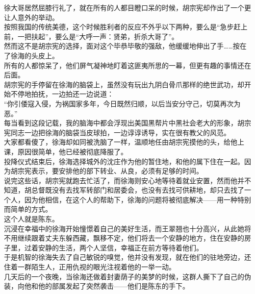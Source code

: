 \begin{multicols}{\theparacolNo}
徐大哥居然屈膝行礼了，就在所有的人都目瞪口呆的时候，胡宗宪却作出了一个更让人意外的举动。\\

按照我国的传统美德，这个时候胜利者的反应不外乎以下两种，要么是“急步赶上前，一把扶起”，要么是“大呼一声：贤弟，折杀大哥了”。\\

然而这不是胡宗宪的选择，面对这个毕恭毕敬的强敌，他缓缓地伸出了手……按在了徐海的头皮上。\\

所有的人都惊呆了，他们屏气凝神地盯着这匪夷所思的一幕，但更有趣的事情还在后面。\\

胡宗宪的手停留在徐海的脑袋上，虽然没有玩出九阴白骨爪那样的绝世武功，却开始不停地拍抚，一边拍还一边说道：\\

“你引倭寇入侵，为祸国家多年，今日既然归顺，以后当安分守己，切莫再次为恶。”\\

每当看到这段记载，我的脑海中都会浮现出美国黑帮片中黑社会老大的形象，胡宗宪同志一边把徐海的脑袋当皮球拍，一边谆谆诱导，实在很有教父的风范。\\

大家都看傻了，徐海却如同被洗脑了一样，温顺地任由胡宗宪摸他的头，给他上课，原因很简单，他已经被彻底降服了。\\

投降仪式结束后，徐海选择城外的沈庄作为他的暂住地，和他的属下住在一起。因为胡宗宪表示，要安排他的部下转业、从良，必须有足够的时间。\\

说完这些话，胡宗宪就跑去忙活了，而徐海则安心地等待着就业安置，然而他并不知道，胡总督既没有去找军转部门和居委会，也没有去找可供耕地，却只去找了一个人，因为他相信，在这个人的帮助下，徐海的问题将被彻底解决——用一种特别而简单的方式。\\

这个人就是陈东。\\

沉浸在幸福中的徐海开始憧憬着自己的美好生活，而王翠翘也十分高兴，从此她将不用继续跟着丈夫东躲西藏，飘移不定，他们将去一个安静的地方，住在安静的房子里，过着安静的生活，两个人坚信，幸福正在前方等待着他们。\\

于是机智的徐海失去了自己敏锐的嗅觉，他并没有发现，就在他们的驻地旁边，还住着一群陌生人，正用仇视的眼光注视着他的一举一动。\\

几天后的一个夜晚，当徐海还做着封妻荫子的美梦的时候，这群人撕下了自己的伪装，向他和他的部属发起了突然袭击——他们是陈东的手下。\\


\end{multicols}

